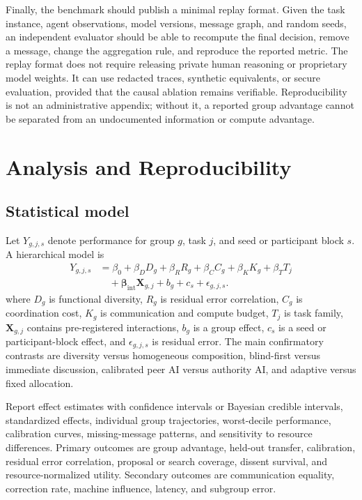 \documentclass[conference]{IEEEtran}
\begin{document}
Finally, the benchmark should publish a minimal replay format. Given the task instance, agent observations, model versions, message graph, and random seeds, an independent evaluator should be able to recompute the final decision, remove a message, change the aggregation rule, and reproduce the reported metric. The replay format does not require releasing private human reasoning or proprietary model weights. It can use redacted traces, synthetic equivalents, or secure evaluation, provided that the causal ablation remains verifiable. Reproducibility is not an administrative appendix; without it, a reported group advantage cannot be separated from an undocumented information or compute advantage.

\section{Analysis and Reproducibility}

\subsection{Statistical model}

Let $Y_{g,j,s}$ denote performance for group $g$, task $j$, and seed or participant block $s$. A hierarchical model is
\begin{align}
Y_{g,j,s} &= \beta_0+\beta_DD_g+\beta_RR_g+\beta_CC_g+\beta_KK_g+\beta_TT_j \nonumber\\
&\quad +\mathbf{\beta}_{\mathrm{int}}\mathbf{X}_{g,j}+b_g+c_s+\epsilon_{g,j,s}.
\label{eq:hierarchical}
\end{align}
where $D_g$ is functional diversity, $R_g$ is residual error correlation, $C_g$ is coordination cost, $K_g$ is communication and compute budget, $T_j$ is task family, $\mathbf{X}_{g,j}$ contains pre-registered interactions, $b_g$ is a group effect, $c_s$ is a seed or participant-block effect, and $\epsilon_{g,j,s}$ is residual error. The main confirmatory contrasts are diversity versus homogeneous composition, blind-first versus immediate discussion, calibrated peer AI versus authority AI, and adaptive versus fixed allocation.

Report effect estimates with confidence intervals or Bayesian credible intervals, standardized effects, individual group trajectories, worst-decile performance, calibration curves, missing-message patterns, and sensitivity to resource differences. Primary outcomes are group advantage, held-out transfer, calibration, residual error correlation, proposal or search coverage, dissent survival, and resource-normalized utility. Secondary outcomes are communication equality, correction rate, machine influence, latency, and subgroup error.
\end{document}

